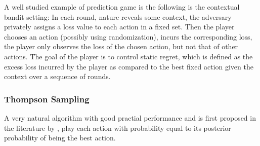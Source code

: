  A well studied example of prediction game is the following is the contextual bandit setting: In each round, nature reveals some context, the adversary privately assigns a loss value to each action in a fixed set.
 Then the player chooses an action (possibly using randomization), incurs the corresponding loss, the player only observes the loss of the chosen action, but not that of other actions.
 The goal of the player is to control static regret, which is defined as the excess loss incurred by the player as compared to the best fixed action given the context over a sequence of rounds.


\subsubsection{Thompson Sampling}

 A very natural algorithm with good practial performance and is first proposed in the literature by \cite{thompson:33}, play each action with probability equal to its posterior probability of being the best action.








